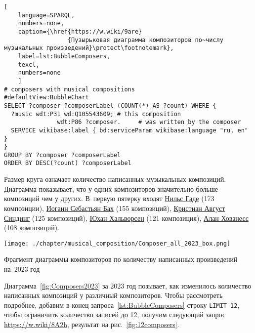 \begin{lstlisting}[ 
    language=SPARQL, 
    numbers=none,
    caption={\href{https://w.wiki/9are}
                  {Пузырьковая диаграмма композиторов по~числу музыкальных произведений}\protect\footnotemark},
    label=lst:BubbleComposers,
    texcl,
    numbers=none
    ]
# composers with musical compositions
#defaultView:BubbleChart
SELECT ?composer ?composerLabel (COUNT(*) AS ?count) WHERE {
  ?music wdt:P31 wd:Q105543609; # this composition
               wdt:P86 ?composer.     # was written by the composer
  SERVICE wikibase:label { bd:serviceParam wikibase:language "ru, en" }
}
GROUP BY ?composer ?composerLabel
ORDER BY DESC(?count) ?composerLabel
\end{lstlisting}%

Размер круга означает количество написанных музыкальных композиций. Диаграмма показывает, что у одних композиторов значительно больше композиций чем у других. В~первую пятерку входят \href{https://ru.wikipedia.org/wiki/Гаде,_Нильс}{Нильс Гаде} (\num{173} композиции), \href{https://ru.wikipedia.org/wiki/Бах,_Иоганн_Себастьян}{Иоганн Себастьян Бах} (\num{155} композиций), \href{https://ru.wikipedia.org/wiki/Синдинг,_Кристиан_Август}{Кристиан Август Синдинг} (\num{125} композиций), \href{https://ru.wikipedia.org/wiki/Хальворсен,_Юхан}{Юхан Хальворсен} (\num{121} композиция), \href{https://ru.wikipedia.org/wiki/Хованесс,_Алан}{Алан Хованесс} (\num{108} композиций).

%
%
\begin{marginfigure}[-6\baselineskip]
  \texttt{[image: ./chapter/musical\_composition/Composer\_all\_2023\_box.png]}
  \vspace{-7pt}
  \caption[Пузырьковая диаграмма композиторов по количеству написанных композиций на~2023 год]
    {Фрагмент диаграммы композиторов по количеству написанных произведений на~2023 год}%
  \label{fig:Composers2023}%
\end{marginfigure}

Диаграмма~\ref{fig:Composers2023} за 2023 год позывает, 
как изменилось количество написанных композиций у различный композиторов. 
Чтобы рассмотреть подробнее, 
добавим в конец запроса~\ref{lst:BubbleComposers} строку  \lstinline|LIMIT 12|, 
чтобы ограничить количество записей до 12, 
получим следующий запрос \href{https://w.wiki/8A2h}{https://w.wiki/8A2h}, 
результат на рис.~\ref{fig:12composers}. 

